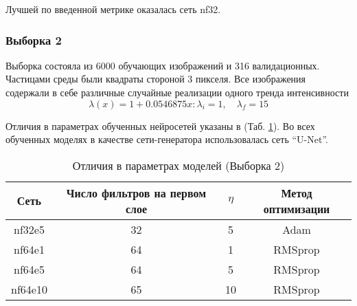 			Лучшей по введенной метрике оказалась сеть nf32.
		\subsubsection{Выборка 2}
			Выборка состояла из 6000 обучающих изображений и 316 валидационных. Частицами среды были квадраты стороной 3 пикселя. Все изображения содержали в себе различные случайные реализации одного тренда интенсивности
			$$\lambda(x) = 1 + 0.0546875x: \lambda_i = 1, \quad \lambda_f = 15$$
			
			Отличия в параметрах обученных нейросетей указаны в (Таб. \ref{8-sand-trend8-nns}). Во всех обученных моделях в качестве сети-генератора использовалась сеть ``U-Net''.
			
			\begin{table}[h!]
				\begin{center}
					\begin{tabular}{|c|c|c|c|}
						\hline
						Сеть & Число фильтров на первом слое & $\eta$ & Метод оптимизации\\
						\hline
						nf32e5 & 32 & 5 & Adam \\
						\hline
						nf64e1 & 64 & 1 & RMSprop \\
						\hline
						nf64e5 & 64 & 5 & RMSprop \\
						\hline
						nf64e10 & 65 & 10 & RMSprop \\
						\hline
					\end{tabular}
					\caption{Отличия в параметрах моделей (Выборка 2)}
					\label{8-sand-trend8-nns}
				\end{center}
			\end{table}
			
